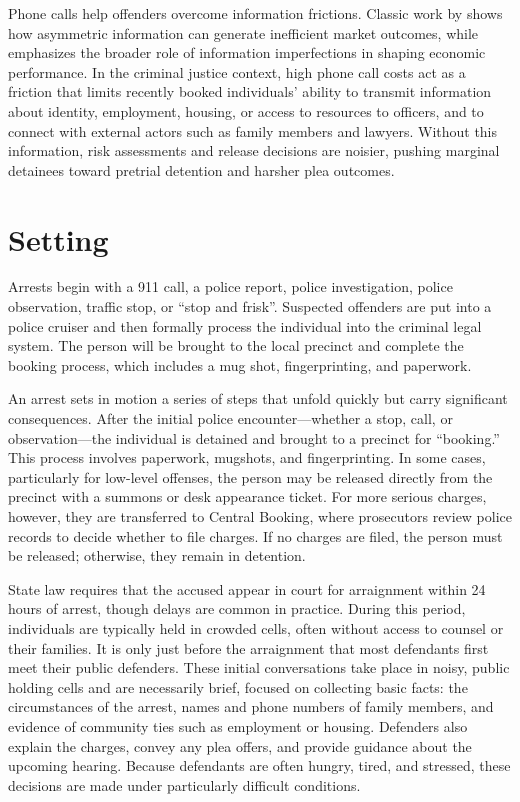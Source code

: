 \documentclass[12pt, a4paper]{article}
\begin{document}
Phone calls help offenders overcome information frictions. Classic work by \citet{Akerlof1970} shows how asymmetric information can generate inefficient market outcomes, while \citet{Stiglitz2000} emphasizes the broader role of information imperfections in shaping economic performance. In the criminal justice context, high phone call costs act as a friction that limits recently booked individuals' ability to transmit information about identity, employment, housing, or access to resources to officers, and to connect with external actors such as family members and lawyers. Without this information, risk assessments and release decisions are noisier, pushing marginal detainees toward pretrial detention and harsher plea outcomes. 

\section{Setting}

Arrests begin with a 911 call, a police report, police investigation, police observation, traffic stop, or ``stop and frisk''. Suspected offenders are put into a police cruiser and then formally process the individual into the criminal legal system. The person will be brought to the local precinct and complete the booking process, which includes a mug shot, fingerprinting, and paperwork. 

An arrest sets in motion a series of steps that unfold quickly but carry significant consequences. After the initial police encounter—whether a stop, call, or observation—the individual is detained and brought to a precinct for “booking.” This process involves paperwork, mugshots, and fingerprinting. In some cases, particularly for low-level offenses, the person may be released directly from the precinct with a summons or desk appearance ticket. For more serious charges, however, they are transferred to Central Booking, where prosecutors review police records to decide whether to file charges. If no charges are filed, the person must be released; otherwise, they remain in detention.

State law requires that the accused appear in court for arraignment within 24 hours of arrest, though delays are common in practice. During this period, individuals are typically held in crowded cells, often without access to counsel or their families. It is only just before the arraignment that most defendants first meet their public defenders. These initial conversations take place in noisy, public holding cells and are necessarily brief, focused on collecting basic facts: the circumstances of the arrest, names and phone numbers of family members, and evidence of community ties such as employment or housing. Defenders also explain the charges, convey any plea offers, and provide guidance about the upcoming hearing. Because defendants are often hungry, tired, and stressed, these decisions are made under particularly difficult conditions.
\end{document}

